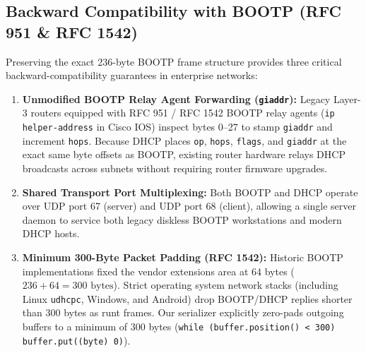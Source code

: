\documentclass[11pt,a4paper]{article}
\begin{document}
\subsection{Backward Compatibility with BOOTP (RFC 951 \& RFC 1542)}
Preserving the exact 236-byte BOOTP frame structure provides three critical backward-compatibility guarantees in enterprise networks:
\begin{enumerate}[leftmargin=2em]
    \item \textbf{Unmodified BOOTP Relay Agent Forwarding (\texttt{giaddr}):} Legacy Layer-3 routers equipped with RFC 951 / RFC 1542 BOOTP relay agents (\texttt{ip helper-address} in Cisco IOS) inspect bytes 0--27 to stamp \texttt{giaddr} and increment \texttt{hops}. Because DHCP places \texttt{op}, \texttt{hops}, \texttt{flags}, and \texttt{giaddr} at the exact same byte offsets as BOOTP, existing router hardware relays DHCP broadcasts across subnets without requiring router firmware upgrades.
    \item \textbf{Shared Transport Port Multiplexing:} Both BOOTP and DHCP operate over UDP port 67 (server) and UDP port 68 (client), allowing a single server daemon to service both legacy diskless BOOTP workstations and modern DHCP hosts.
    \item \textbf{Minimum 300-Byte Packet Padding (RFC 1542):} Historic BOOTP implementations fixed the vendor extensions area at 64 bytes ($236 + 64 = 300\text{ bytes}$). Strict operating system network stacks (including Linux \texttt{udhcpc}, Windows, and Android) drop BOOTP/DHCP replies shorter than 300 bytes as runt frames. Our serializer explicitly zero-pads outgoing buffers to a minimum of 300 bytes (\texttt{while (buffer.position() < 300) buffer.put((byte) 0)}).
\end{enumerate}
\end{document}
